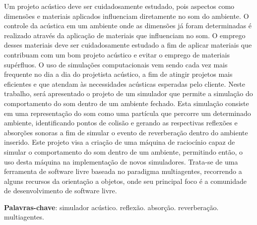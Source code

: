 \begin{resumo}

Um projeto acústico deve ser cuidadosamente estudado, pois aspectos como dimensões e materiais aplicados influenciam diretamente no som do ambiente. O controle da acústica em um ambiente onde as dimensões já foram determinadas é realizado através da aplicação de materiais que influenciam no som. O emprego desses materiais deve ser cuidadosamente estudado a fim de aplicar materiais que contribuam com um bom projeto acústico e evitar o emprego de materiais supérfluos. O uso de simulações computacionais vem sendo cada vez mais frequente no dia a dia do projetista acústico, a fim de atingir projetos mais eficientes e que atendam às necessidades acústicas esperadas pelo cliente. Neste trabalho, será apresentado o projeto de um simulador que permite a simulação do comportamento do som dentro de um ambiente fechado. Esta simulação consiste em uma representação do som como uma partícula que percorre um determinado ambiente, identificando pontos de colisão e gerando as respectivas reflexões e absorções sonoras a fim de simular o evento de reverberação dentro do ambiente inserido. Este projeto visa a criação de uma máquina de raciocínio capaz de simular o comportamento do som dentro de um ambiente, permitindo então, o uso desta máquina na implementação de novos simuladores. Trata-se de uma ferramenta de software livre baseada no paradigma multiagentes, recorrendo a alguns recursos da orientação a objetos, onde seu principal foco é a comunidade de desenvolvimento de software livre. 

 \vspace{\onelineskip}
    
 \noindent
 \textbf{Palavras-chave}: simulador acústico. reflexão. absorção. reverberação. multiagentes.
\end{resumo}
